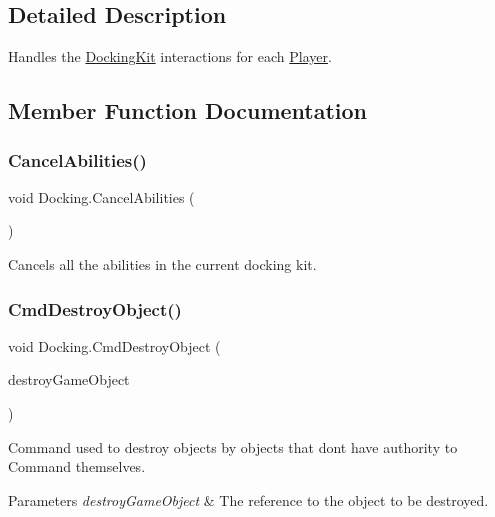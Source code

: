 \subsection{Detailed Description}
Handles the \hyperlink{class_docking_kit}{Docking\+Kit} interactions for each \hyperlink{class_player}{Player}. 



\subsection{Member Function Documentation}
\hypertarget{class_docking_a8732fdddd1a146c1de3491d3981e68b6}{}\label{class_docking_a8732fdddd1a146c1de3491d3981e68b6} 
\subsubsection{\texorpdfstring{Cancel\+Abilities()}{CancelAbilities()}}
{\footnotesize\ttfamily void Docking.\+Cancel\+Abilities (\begin{DoxyParamCaption}{ }\end{DoxyParamCaption})}



Cancels all the abilities in the current docking kit. 

\hypertarget{class_docking_ab0ce11f5480cfae24f0ffd9f2735d22e}{}\label{class_docking_ab0ce11f5480cfae24f0ffd9f2735d22e} 
\subsubsection{\texorpdfstring{Cmd\+Destroy\+Object()}{CmdDestroyObject()}}
{\footnotesize\ttfamily void Docking.\+Cmd\+Destroy\+Object (\begin{DoxyParamCaption}\item[{Game\+Object}]{destroy\+Game\+Object }\end{DoxyParamCaption})}



Command used to destroy objects by objects that don\textquotesingle{}t have authority to Command themselves. 


\begin{DoxyParams}{Parameters}
{\em destroy\+Game\+Object} & The reference to the object to be destroyed.\\
\hline
\end{DoxyParams}
\hypertarget{class_docking_af3c0779cf0d84911417822b5ec2c671f}{}\label{class_docking_af3c0779cf0d84911417822b5ec2c671f} 

